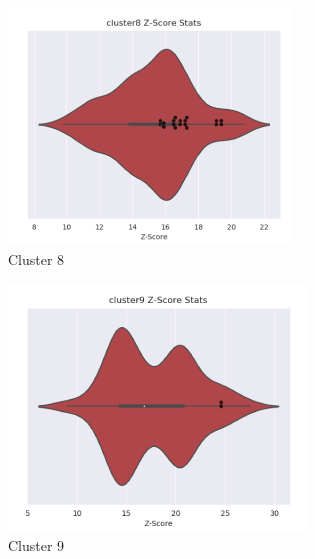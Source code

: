 \begin{figure}[htb]
\begin{subfigure}{0.2\textwidth}
  \includegraphics[width=\linewidth]{Pfam/cl08.png}
  \caption{Cluster 8}
  \label{fig:cl08}
\end{subfigure}\hfil %
\begin{subfigure}{0.2\textwidth}
  \includegraphics[width=\linewidth]{Pfam/cl09.png}
  \caption{Cluster 9}
  \label{fig:cl09}
\end{subfigure}\hfil %
\begin{subfigure}{0.2\textwidth}

\end{subfigure}
\end{figure}
